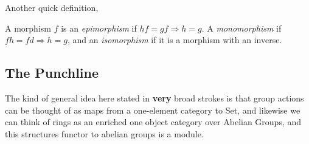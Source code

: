 \documentclass[12pt, twosided]{article}
\begin{document}
Another quick definition,

\begin{df}
  A morphism \(f\) is an \textit{epimorphism} if \(hf = gf \Rightarrow h = g\). A \textit{monomorphism} if \(fh = fd \Rightarrow h = g\), and an \textit{isomorphism} if it is a morphism with an inverse.
\end{df}

\subsection{The Punchline}

The kind of general idea here stated in \textbf{very} broad strokes is that group actions can be thought of as maps from a one-element category to Set, and likewise we can think of rings as an enriched one object category over Abelian Groups, and this structures functor to abelian groups is a module.
\end{document}
